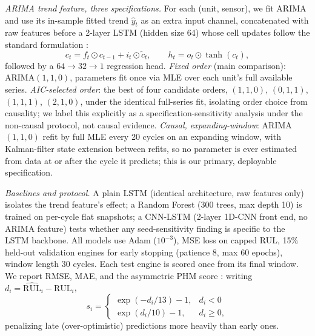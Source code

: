 \documentclass[conference]{IEEEtran}
\begin{document}
\emph{ARIMA trend feature, three specifications.} For each (unit, sensor), we fit ARIMA and use its in-sample fitted trend $\hat{y}_t$ as an extra input channel, concatenated with raw features before a 2-layer LSTM (hidden size 64) whose cell updates follow the standard formulation \cite{lstm1997}:
\begin{equation}
c_t = f_t \odot c_{t-1} + i_t \odot \tilde{c}_t, \qquad h_t = o_t \odot \tanh(c_t),
\end{equation}
followed by a $64{\to}32{\to}1$ regression head. \emph{Fixed order} (main comparison): ARIMA$(1,1,0)$, parameters fit once via MLE over each unit's full available series. \emph{AIC-selected order}: the best of four candidate orders, $(1,1,0)$, $(0,1,1)$, $(1,1,1)$, $(2,1,0)$, under the identical full-series fit, isolating order choice from causality; we label this explicitly as a specification-sensitivity analysis under the non-causal protocol, not causal evidence. \emph{Causal, expanding-window}: ARIMA$(1,1,0)$ refit by full MLE every 20 cycles on an expanding window, with Kalman-filter state extension between refits, so no parameter is ever estimated from data at or after the cycle it predicts; this is our primary, deployable specification.

\emph{Baselines and protocol.} A plain LSTM (identical architecture, raw features only) isolates the trend feature's effect; a Random Forest (300 trees, max depth 10) is trained on per-cycle flat snapshots; a CNN-LSTM (2-layer 1D-CNN front end, no ARIMA feature) \cite{cnnlstm2024} tests whether any seed-sensitivity finding is specific to the LSTM backbone. All models use Adam ($10^{-3}$), MSE loss on capped RUL, 15\% held-out validation engines for early stopping (patience 8, max 60 epochs), window length 30 cycles. Each test engine is scored once from its final window. We report RMSE, MAE, and the asymmetric PHM score \cite{saxena2008}: writing $d_i=\widehat{\mathrm{RUL}}_i-\mathrm{RUL}_i$,
\begin{equation}
s_i = \begin{cases} \exp(-d_i/13)-1, & d_i<0 \\ \exp(d_i/10)-1, & d_i\geq 0, \end{cases}
\end{equation}
penalizing late (over-optimistic) predictions more heavily than early ones.
\end{document}
